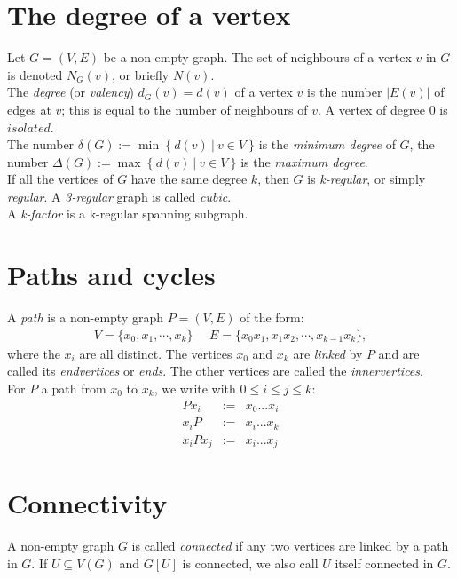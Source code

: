 	\section{The degree of a vertex}
		Let $G = (V, E)$ be a non-empty graph. The set of neighbours of a vertex $v$ in $G$ is denoted $N_G (v)$, or briefly $N(v)$.\\

		The \textit{degree} (or \textit{valency}) $d_G (v) = d(v)$ of a vertex $v$ is the number $|E(v)|$ of edges at $v$; this is equal to the number of neighbours of $v$. A vertex of degree 0 is $isolated$. \\
		
		The number $\delta(G) := \min~ \{~ d(v) ~| ~v \in V ~\}$ is the \textit{minimum degree} of $G$, the number $\Delta(G) := \max ~\{~ d(v) ~|~ v \in V ~\}$ is the \textit{maximum degree}.\\
		
		If all the vertices of $G$ have the same degree $k$, then $G$ is \textit{k-regular}, or simply \textit{regular}. A \textit{3-regular} graph is called \textit{cubic}.\\

                A \textit{k-factor} is a k-regular spanning subgraph.

	\section{Paths and cycles}
		A \textit{path} is a non-empty graph $P = (V, E)$ of the form:
		\begin{eqnarray*}
			V = \{x_0, x_1, \dotsb, x_k \} ~~~~~~ E = \{x_0x_1, x_1x_2, \dotsb, x_{k-1}x_k\},
		\end{eqnarray*}		
		where the $x_i$ are all distinct. The vertices $x_0$ and $x_k$ are \textit{linked} by $P$ and are called its \textit{endvertices} or \textit{ends}. The other vertices are called the \textit{innervertices}.\\
		
		For $P$ a path from $x_0$ to $x_k$, we write with $0 \leq i \leq j \leq k$:
		\begin{eqnarray*}
			Px_i &:=& x_0 ... x_i\\
			x_iP &:=& x_i ... x_k\\
			x_iPx_j &:=& x_i ... x_j
		\end{eqnarray*}
	
	\section{Connectivity}
	A non-empty graph $G$ is called \textit{connected} if any two vertices are linked by a path in $G$. If $U \subseteq V(G)$ and $G[U]$ is connected, we also call $U$ itself connected in $G$.\\

